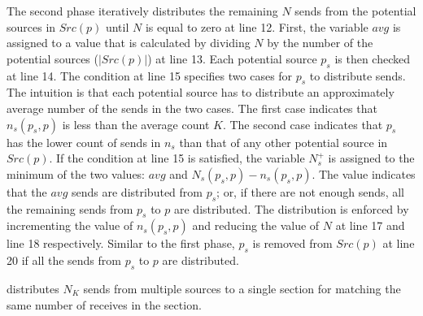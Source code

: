 The second phase iteratively distributes the remaining $N$ sends from the potential sources in $Src(p)$ until $N$ is equal to zero at line 12. 
First, the variable $avg$ is assigned to a value that is calculated by dividing $N$ by the number of the potential sources ($|Src(p)|$) at line 13. 
Each potential source $p_{s}$ is then checked at line 14. 
The condition at line 15 specifies two cases for $p_{s}$ to distribute sends. The intuition is that each potential source has to distribute an approximately average number of the sends in the two cases. The first case indicates that $n_s(p_{s},p)$ is less than the average count $K$. The second case indicates that $p_{s}$ has the lower count of sends in $n_s$ than that of any other potential source in $Src(p)$. 
If the condition at line 15 is satisfied, the variable $N_s^+$ is assigned to the minimum of the two values: $avg$ and $N_s(p_{s},p)-\mathit{n_s}(p_{s},p)$. The value indicates that the $avg$ sends are distributed from $p_s$; or, if there are not enough sends, all the remaining sends from $p_{s}$ to $p$ are distributed.  
The distribution is enforced by incrementing the value of $n_s(p_{s},p)$ and reducing the value of $N$ at line 17 and line 18 respectively. Similar to the first phase, $p_{s}$ is removed from $Src(p)$ at line 20 if all the sends from $p_{s}$ to $p$ are distributed.  

\begin{lemma}
 distributes $N_K$ sends from multiple sources to a single section for matching the same number of receives in the section.
\label{lemma:distribute}
\end{lemma}

